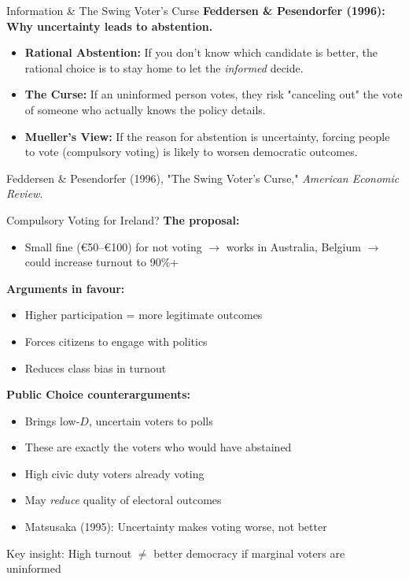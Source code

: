 \documentclass[10pt]{beamer}
\begin{document}
\begin{frame}{Information \& The Swing Voter's Curse}
\textbf{Feddersen \& Pesendorfer (1996): Why uncertainty leads to abstention.}

\begin{itemize}
\item \textbf{Rational Abstention:} If you don't know which candidate is better, the rational choice is to stay home to let the \emph{informed} decide.
\item \textbf{The Curse:} If an uninformed person votes, they risk "canceling out" the vote of someone who actually knows the policy details.
\item \textbf{Mueller's View:} If the reason for abstention is uncertainty, forcing people to vote (compulsory voting) is likely to \alert{worsen} democratic outcomes.
\end{itemize}



\footnotesize{Feddersen \& Pesendorfer (1996), "The Swing Voter's Curse," \emph{American Economic Review}.}
\end{frame}

\begin{frame}{Compulsory Voting for Ireland?}
\textbf{The proposal:}
\begin{itemize}
\item Small fine (€50--€100) for not voting $\rightarrow$ works in Australia, Belgium $\rightarrow$ could increase turnout to 90\%+
\end{itemize}



\textbf{Arguments in favour:}
\begin{itemize}
\item Higher participation = more legitimate outcomes
\item Forces citizens to engage with politics
\item Reduces class bias in turnout
\end{itemize}



\textbf{Public Choice counterarguments:}
\begin{itemize}
\item Brings \alert{low-$D$, uncertain} voters to polls
\item These are exactly the voters who would have abstained
\item High civic duty voters already voting
\item May \emph{reduce} quality of electoral outcomes
\item Matsusaka (1995): Uncertainty makes voting worse, not better
\end{itemize}

\alert{Key insight:} High turnout $\neq$ better democracy if marginal voters are uninformed
\end{frame}
\end{document}
